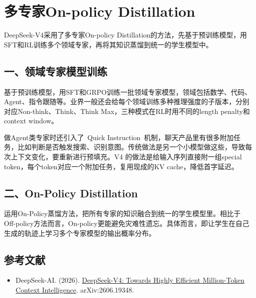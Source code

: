 \setcounter{section}{5}

\hypertarget{ux591aux4e13ux5bb6on-policy-distillation}{%
\section{多专家On-policy Distillation}\label{ux591aux4e13ux5bb6on-policy-distillation}}

DeepSeek-V4采用了多专家On-policy Distillation的方法，先基于预训练模型，用SFT和RL训练多个领域专家，再将其知识蒸馏到统一的学生模型中。

\hypertarget{ux4e00ux9886ux57dfux4e13ux5bb6ux6a21ux578bux8badux7ec3}{%
\subsection{一、领域专家模型训练}\label{ux4e00ux9886ux57dfux4e13ux5bb6ux6a21ux578bux8badux7ec3}}

基于预训练模型，用SFT和GRPO训练一批领域专家模型，领域包括数学、代码、Agent、指令跟随等。业界一般还会给每个领域训练多种推理强度的子版本，分别对应Non-think、Think、Think Max，三种模式在RL时用不同的length penalty和context window。

做Agent类专家时还引入了~Quick Instruction~机制，聊天产品里有很多附加任务，比如判断是否触发搜索、识别意图。传统做法是另一个小模型做这些，导致每次上下文变化，要重新进行预填充。V4 的做法是给输入序列直接附一组special token，每个token对应一个附加任务，复用现成的KV cache，降低首字延迟。

\hypertarget{ux4e8con-policy-distillation}{%
\subsection{二、On-Policy Distillation}\label{ux4e8con-policy-distillation}}

运用On-Policy蒸馏方法，把所有专家的知识融合到统一的学生模型里。相比于Off-policy方法而言，On-policy更能避免灾难性遗忘。具体而言，即让学生在自己生成的轨迹上学习多个专家模型的输出概率分布。

\FloatBarrier
{}
\hypertarget{ux53c2ux8003ux6587ux732e-106}{%
\subsection{参考文献}\label{ux53c2ux8003ux6587ux732e-106}}

\vspace{0.25em}
\begin{itemize}
\tightlist
\item
  DeepSeek-AI. (2026). \href{https://arxiv.org/abs/2606.19348}{DeepSeek-V4: Towards Highly Efficient Million-Token Context Intelligence}. arXiv:2606.19348.
\end{itemize}

\clearpage
